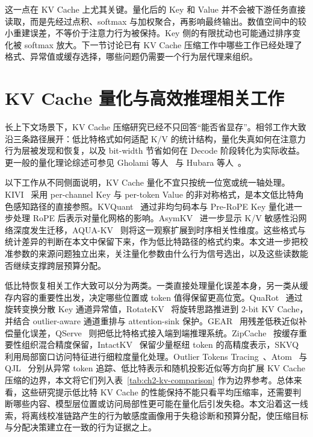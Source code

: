 这一点在 KV Cache 上尤其关键。量化后的 Key 和 Value 并不会被下游任务直接读取，而是先经过点积、softmax 与加权聚合，再影响最终输出。数值空间中的较小重建误差，不等价于注意力行为被保持。Key 侧的有限扰动也可能通过排序变化被 softmax 放大。下一节讨论已有 KV Cache 压缩工作中哪些工作已经处理了格式、异常值或缓存选择，哪些问题仍需要一个行为层代理来组织。

\section{KV Cache 量化与高效推理相关工作}

长上下文场景下，KV Cache 压缩研究已经不只回答“能否省显存”。相邻工作大致沿三条路径展开：低比特格式如何适配 K/V 的统计结构，量化失真如何在注意力行为层被发现和恢复，以及 bit-width 节省如何在 Decode 阶段转化为实际收益。更一般的量化理论综述可参见 Gholami 等人~\cite{gholami2022survey} 与 Hubara 等人~\cite{hubara2018quantized}。

以下工作从不同侧面说明，KV Cache 量化不宜只按统一位宽或统一轴处理。KIVI~\cite{liu2024kivi} 采用 per-channel Key 与 per-token Value 的非对称格式，是本文低比特角色感知路径的直接参照。KVQuant~\cite{hooper2024kvquant} 通过非均匀码本与 Pre-RoPE Key 量化进一步处理 RoPE 后表示对量化网格的影响。AsymKV~\cite{tao2024asymkv} 进一步显示 K/V 敏感性沿网络深度发生迁移，AQUA-KV~\cite{shutova2025aquakv} 则将这一观察扩展到时序相关性维度。这些格式与统计差异的判断在本文中保留下来，作为低比特路径的格式约束。本文进一步把校准参数的来源问题独立出来，关注量化参数由什么行为信号选出，以及这些读数能否继续支撑跨层预算分配。

低比特恢复相关工作大致可以分为两类。一类直接处理量化误差本身，另一类从缓存内容的重要性出发，决定哪些位置或 token 值得保留更高位宽。QuaRot~\cite{ashkboos2024quarot} 通过旋转变换分散 Key 通道异常值，RotateKV~\cite{su2025rotatekv} 将旋转思路推进到 2-bit KV Cache，并结合 outlier-aware 通道重排与 attention-sink 保护。GEAR~\cite{kang2024gear} 用残差低秩近似补偿量化误差，QServe~\cite{lin2024qserve} 则把低比特格式接入端到端推理系统。ZipCache~\cite{he2024zipcache} 按缓存重要性组织混合精度保留，IntactKV~\cite{liu2024intactkv} 保留少量枢纽 token 的高精度表示，SKVQ~\cite{duanmu2024skvq} 利用局部窗口访问特征进行细粒度量化处理。Outlier Tokens Tracing~\cite{su2025outliertoken}、Atom~\cite{zhao2024atom} 与 QJL~\cite{zandieh2024qjl} 分别从异常 token 追踪、低比特表示和随机投影近似等方向扩展 KV Cache 压缩的边界，本文将它们列入表~\ref{tab:ch2-kv-comparison} 作为边界参考。总体来看，这些研究提示低比特 KV Cache 的性能保持不能只看平均压缩率，还需要判断哪些内容、模型层位置或访问局部性更可能在量化后引发失稳。本文沿着这一线索，将离线校准链路产生的行为敏感度画像用于失稳诊断和预算分配，使压缩目标与分配决策建立在一致的行为证据之上。


